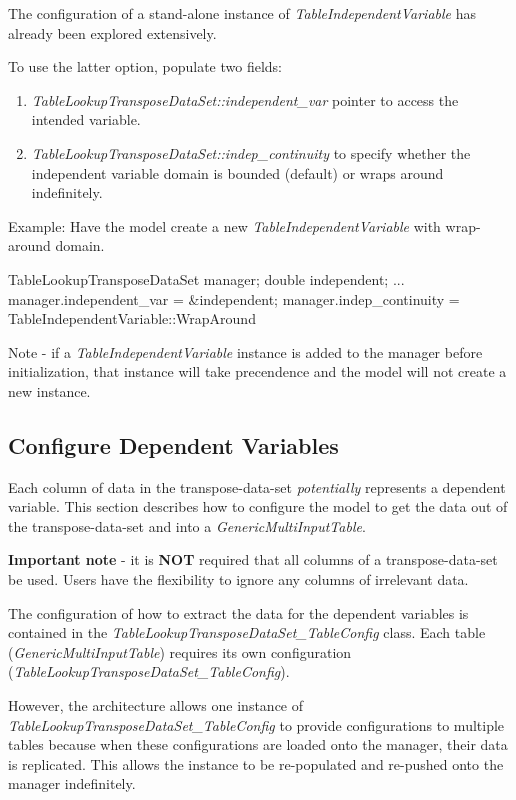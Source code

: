 \documentclass[11pt,fleqn]{report}
\begin{document}
The configuration of a stand-alone instance of
\textit{TableIndependentVariable} has already been explored extensively.

To use the latter option, populate two fields:
\begin {enumerate}
\item \textit{TableLookupTransposeDataSet::independent\_var} pointer to
       access the intended variable.
\item \textit{TableLookupTransposeDataSet::indep\_continuity} to specify
       whether the independent variable domain is bounded (default) or wraps
       around indefinitely.
\end{enumerate}

Example:
Have the model create a new \textit{TableIndependentVariable} with wrap-around
domain.

\begin{code}
TableLookupTransposeDataSet manager;
double                      independent;
...
manager.independent_var = &independent;
manager.indep_continuity = TableIndependentVariable::WrapAround
\end{code}

Note - if a \textit{TableIndependentVariable} instance is added to the manager
before initialization, that instance will take precendence and the model will
not create a new instance.

\subsection{Configure Dependent Variables}\label{sec:UG_transpose_dependent}
Each column of data in the transpose-data-set \textit{potentially} represents a
dependent variable.  This section describes how to configure the model to get
the data out of the transpose-data-set and into a
\textit{GenericMultiInputTable}.

\textbf{Important note} - it is \textbf{NOT} required that all columns of a
transpose-data-set be used.  Users have the flexibility to ignore any columns
of irrelevant data.

The configuration of how to extract the data for the dependent variables is
contained in the \textit{TableLookupTransposeDataSet\_TableConfig} class.
Each table (\textit{GenericMultiInputTable}) requires its own configuration
(\textit{TableLookupTransposeDataSet\_TableConfig}).

However, the architecture allows one instance of
\textit{TableLookupTransposeDataSet\_TableConfig} to provide configurations
to multiple tables because when these configurations are loaded onto the
manager, their data is replicated.  This allows the instance to be
re-populated and re-pushed onto the manager indefinitely.
\end{document}

